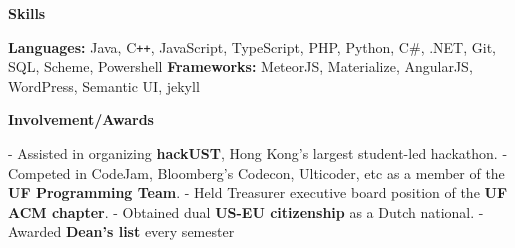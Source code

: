 \documentclass[letterpaper,10pt]{article}
\makeatletter
\newcommand{\resitem}[1]{\item #1 \vspace{-2pt}}
\newcommand{\resheading}[1]{{\large \colorbox{mygrey}{\begin{minipage}{\textwidth}{\textbf{#1 \vphantom{p\^{E}}}}\end{minipage}}}}
\newcommand{\ressubheading}[4]{
\begin{tabular*}{7.0in}{l@{\extracolsep{\fill}}r}
		\textbf{#1} & #2 \\
		\textit{#3} & \textit{#4} \\
\end{tabular*}\vspace{-6pt}}
\makeatother
\begin{document}
\resheading{Skills}

\begin{description}
\textbf{Languages:} \tabto{2.5cm} Java, C{}\verb!++!, JavaScript, TypeScript, PHP, Python, C\#, .NET, Git, SQL, Scheme, Powershell\newline
\textbf{Frameworks:} \tabto{2.5cm} MeteorJS, Materialize, AngularJS, WordPress, Semantic UI, jekyll
\end{description}

\resheading{Involvement/Awards}

\begin{description}
- Assisted in organizing \textbf{hackUST}, Hong Kong's largest student-led hackathon. \newline
- Competed in CodeJam, Bloomberg's Codecon, Ulticoder, etc as a member of the \textbf{UF Programming Team}. \newline
- Held Treasurer executive board position of the \textbf{UF ACM chapter}.\newline
- Obtained dual \textbf{US-EU citizenship} as a Dutch national.\newline
- Awarded \textbf{Dean's list} every semester
\end{description}
\end{document}
